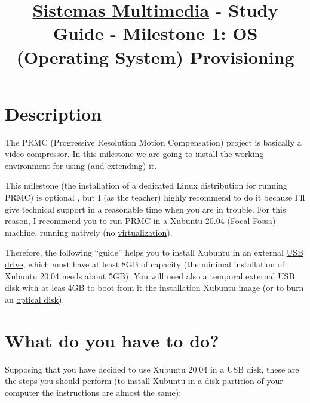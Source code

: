 \title{\href{http://cms.ual.es/UAL/estudios/masteres/plandeestudios/asignaturas/asignatura/MASTER7114?idAss=71142105&idTit=7114}{Sistemas Multimedia} - Study Guide - Milestone 1: OS (Operating System) Provisioning}

\maketitle

\section{Description}

The PRMC (Progressive Resolution Motion Compensation) project is
basically a video compressor. In this milestone we are going to
install the working environment for using (and extending) it.

This milestone (the installation of a dedicated Linux distribution for
running PRMC) is optional , but I (as the teacher) highly
recommend to do it because I'll give technical support in a reasonable
time when you are in trouble. For this reason, I recommend you to run
PRMC in a Xubuntu 20.04 (Focal Fossa) \cite{xubuntu} machine,
running natively
(no \href{https://en.wikipedia.org/wiki/Virtualization}{virtualization}).

Therefore, the following ``guide'' helps you to install Xubuntu in an
external \href{https://en.wikipedia.org/wiki/USB_flash_drive}{USB
drive}, which must have at least 8GB of capacity (the minimal
installation of Xubuntu 20.04 needs about 5GB). You will need also a
temporal external USB disk with at leas 4GB to boot from it the
installation Xubuntu image (or to burn
an \href{https://en.wikipedia.org/wiki/Optical_disc}{optical disk}).

\section{What do you have to do?}

Supposing that you have decided to use Xubuntu 20.04 in a USB disk,
these are the steps you should perform (to install Xubuntu in a disk
partition of your computer the instructions are almost the same):

